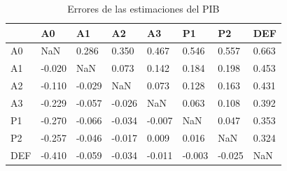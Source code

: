 \begin{table}[htbp]
    \centering
    \caption{Errores de las estimaciones del PIB}
    \label{tab:errores_pib}
    \begin{threeparttable}
        \begin{tabular}{llllllll}
            \toprule
            {} &      A0 &      A1 &      A2 &      A3 &      P1 &      P2 &    DEF \\
            \midrule
            A0  &     NaN &   0.286 &   0.350 &   0.467 &   0.546 &   0.557 &  0.663 \\
            A1  &  -0.020 &     NaN &   0.073 &   0.142 &   0.184 &   0.198 &  0.453 \\
            A2  &  -0.110 &  -0.029 &     NaN &   0.073 &   0.128 &   0.163 &  0.431 \\
            A3  &  -0.229 &  -0.057 &  -0.026 &     NaN &   0.063 &   0.108 &  0.392 \\
            P1  &  -0.270 &  -0.066 &  -0.034 &  -0.007 &     NaN &   0.047 &  0.353 \\
            P2  &  -0.257 &  -0.046 &  -0.017 &   0.009 &   0.016 &     NaN &  0.324 \\
            DEF &  -0.410 &  -0.059 &  -0.034 &  -0.011 &  -0.003 &  -0.025 &    NaN \\
            \bottomrule
        \end{tabular}
    \end{threeparttable}
\end{table}
